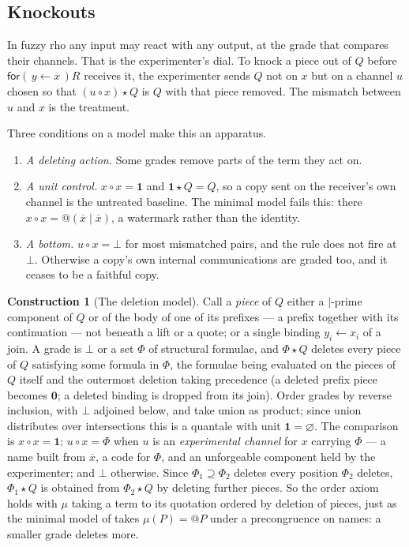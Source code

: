 \documentclass[11pt]{article}
\makeatletter
\theoremstyle{definition}
\newtheorem{construction}[definition]{Construction}
\theoremstyle{plain}
\theoremstyle{remark}
\newcommand{\quo}[1]{@#1}
\newcommand{\dr}[1]{\overline{#1}}
\newcommand{\inp}[3]{\mathsf{for}(\,#1 \leftarrow #2\,)#3}
\newcommand{\nil}{\mathbf{0}}
\newcommand{\act}{\mathbin{\star}}
\newcommand{\cmp}{\mathbin{\circ}}
\newcommand{\unit}{\mathbf{1}}
\makeatother
\begin{document}
\subsection{Knockouts}

In fuzzy rho any input may react with any output, at the grade that
compares their channels. That is the experimenter's dial. To knock a piece
out of $Q$ before $\inp{y}{x}{R}$ receives it, the experimenter sends $Q$
not on $x$ but on a channel $u$ chosen so that $(u \cmp x) \act Q$ is $Q$
with that piece removed. The mismatch between $u$ and $x$ is the
treatment.

Three conditions on a model make this an apparatus.
\begin{enumerate}[label=(K\arabic*),leftmargin=2.6em]
\item \emph{A deleting action.} Some grades remove parts of the term they
act on.
\item \emph{A unit control.} $x \cmp x = \unit$ and $\unit \act Q = Q$, so
a copy sent on the receiver's own channel is the untreated baseline.
The minimal model fails this: there $x \cmp x = \quo{(\dr x \mid \dr x)}$,
a watermark rather than the identity.
\item \emph{A bottom.} $u \cmp x = \bot$ for most mismatched pairs, and
the rule does not fire at $\bot$. Otherwise a copy's own internal
communications are graded too, and it ceases to be a faithful copy.
\end{enumerate}

\begin{construction}[The deletion model]\label{con:deletion}
Call a \emph{piece} of $Q$ either a $\mid$-prime component of $Q$ or of the
body of one of its prefixes --- a prefix together with its continuation
--- not beneath a lift or a quote; or a single binding $y_i \leftarrow
x_i$ of a join. A grade is $\bot$ or a set $\Phi$ of structural formulae,
and $\Phi \act Q$ deletes every piece of $Q$ satisfying some formula in
$\Phi$, the formulae being evaluated on the pieces of $Q$ itself and the
outermost deletion taking precedence (a deleted prefix piece becomes
$\nil$; a deleted binding is dropped from its join). Order grades by reverse inclusion, with $\bot$ adjoined
below, and take union as product; since union distributes over
intersections this is a quantale with unit $\unit = \varnothing$. The
comparison is $x \cmp x = \unit$; $u \cmp x = \Phi$ when $u$ is an
\emph{experimental channel} for $x$ carrying $\Phi$ --- a name built from
$\dr x$, a code for $\Phi$, and an unforgeable component held by the
experimenter; and $\bot$ otherwise. Since $\Phi_1 \supseteq \Phi_2$
deletes every position $\Phi_2$ deletes, $\Phi_1 \act Q$ is obtained from
$\Phi_2 \act Q$ by deleting further pieces. So the order axiom holds with
$\mu$ taking a term to its quotation ordered by deletion of pieces, just
as the minimal model of \cite{FuzzyRho} takes $\mu(P) = \quo{P}$ under a
precongruence on names: a smaller grade deletes more.
\end{construction}
\end{document}
